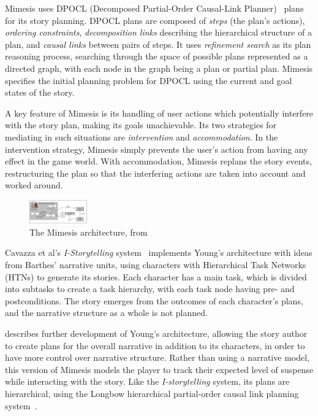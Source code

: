 Mimesis uses DPOCL (Decomposed Partial-Order Causal-Link Planner)~\cite{young1994decomposition} plans for
its story planning. DPOCL plans are composed of \emph{steps} (the plan's
actions), \emph{ordering constraints}, \emph{decomposition links} describing the
hierarchical structure of a plan, and \emph{causal links} between pairs of
steps. It uses \emph{refinement search} \cite{kambhampati1995planning} as its
plan reasoning process, searching through the space of possible plans represented as a directed
graph, with each node in the graph being a plan or partial plan. Mimesis
specifies the initial planning problem for DPOCL using the current and goal
states of the story.

A key feature of Mimesis is its handling of user actions which potentially
interfere with the story plan, making its goals unachievable. Its two strategies
for mediating in such situations are \emph{intervention} and
\emph{accommodation}. In the intervention strategy, Mimesis simply prevents the
user's action from having any effect in the game world. With accommodation,
Mimesis replans the story events, restructuring the plan so that the interfering
actions are taken into account and worked around.

\begin{figure}[!t]
\centerline{\includegraphics[height=0.4in]{mimesis.png}}
\caption{The Mimesis architecture, from \cite{young2004architecture}}\label{fig:mimesis}
\end{figure}

Cavazza et al's \emph{I-Storytelling} system~\cite{cavazza2002character} implements Young's architecture with ideas from Barthes' narrative units, using characters with Hierarchical Task Networks (HTNs) to generate its stories. Each character has a main task, which is divided into subtasks to create a task hierarchy, with each task node having pre- and postconditions. The story emerges from the outcomes of each character's plans, and the narrative structure as a whole is not planned.

\citep{riedl2003managing} describes further development of Young's architecture,
allowing the story author to create plans for the overall narrative in addition
to its characters, in order to have more control over narrative structure.
Rather than using a narrative model, this version of Mimesis models the player to track their expected level of suspense while interacting with the story. Like the \emph{I-storytelling} system, its plans are hierarchical, using the Longbow hierarchical partial-order causal link planning system~\cite{young1994decomposition}.


